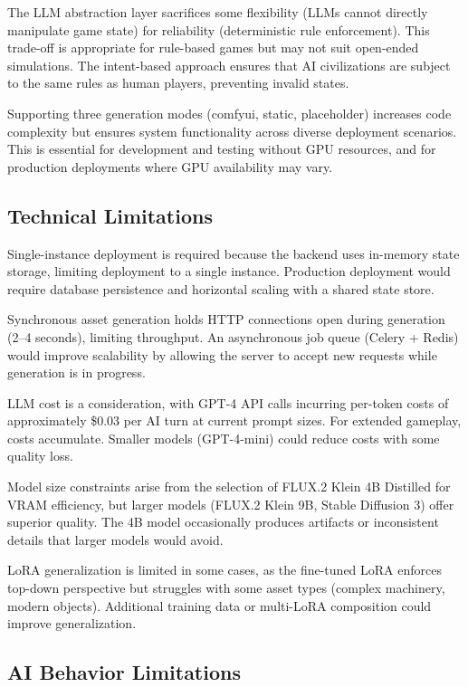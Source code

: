 \documentclass[conference]{IEEEtran}
\begin{document}
The LLM abstraction layer sacrifices some flexibility (LLMs cannot directly manipulate game state) for reliability (deterministic rule enforcement). This trade-off is appropriate for rule-based games but may not suit open-ended simulations. The intent-based approach ensures that AI civilizations are subject to the same rules as human players, preventing invalid states.

Supporting three generation modes (comfyui, static, placeholder) increases code complexity but ensures system functionality across diverse deployment scenarios. This is essential for development and testing without GPU resources, and for production deployments where GPU availability may vary.

\subsection{Technical Limitations}

Single-instance deployment is required because the backend uses in-memory state storage, limiting deployment to a single instance. Production deployment would require database persistence and horizontal scaling with a shared state store.

Synchronous asset generation holds HTTP connections open during generation (2--4 seconds), limiting throughput. An asynchronous job queue (Celery + Redis) would improve scalability by allowing the server to accept new requests while generation is in progress.

LLM cost is a consideration, with GPT-4 API calls incurring per-token costs of approximately \$0.03 per AI turn at current prompt sizes. For extended gameplay, costs accumulate. Smaller models (GPT-4-mini) could reduce costs with some quality loss.

Model size constraints arise from the selection of FLUX.2 Klein 4B Distilled for VRAM efficiency, but larger models (FLUX.2 Klein 9B, Stable Diffusion 3) offer superior quality. The 4B model occasionally produces artifacts or inconsistent details that larger models would avoid.

LoRA generalization is limited in some cases, as the fine-tuned LoRA enforces top-down perspective but struggles with some asset types (complex machinery, modern objects). Additional training data or multi-LoRA composition could improve generalization.

\subsection{AI Behavior Limitations}
\end{document}
